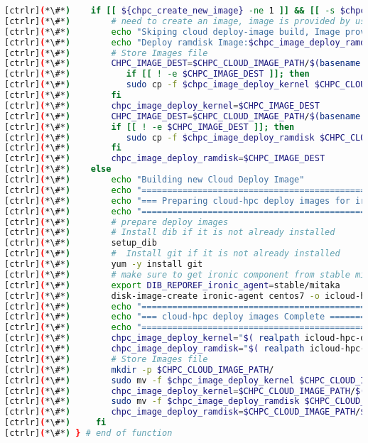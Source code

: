 \begin{lstlisting}[language=bash,keywords={}]
[ctrlr](*\#*)    if [[ ${chpc_create_new_image} -ne 1 ]] && [[ -s $chpc_image_deploy_kernel ]] && [[ -s $chpc_image_deploy_ramdisk ]]; then
[ctrlr](*\#*)        # need to create an image, image is provided by user
[ctrlr](*\#*)        echo "Skiping cloud deploy-image build, Image provided:"
[ctrlr](*\#*)        echo "Deploy ramdisk Image:$chpc_image_deploy_ramdisk"
[ctrlr](*\#*)        # Store Images file
[ctrlr](*\#*)        CHPC_IMAGE_DEST=$CHPC_CLOUD_IMAGE_PATH/$(basename $chpc_image_deploy_kernel)
[ctrlr](*\#*)           if [[ ! -e $CHPC_IMAGE_DEST ]]; then
[ctrlr](*\#*)           sudo cp -f $chpc_image_deploy_kernel $CHPC_CLOUD_IMAGE_PATH/
[ctrlr](*\#*)        fi
[ctrlr](*\#*)        chpc_image_deploy_kernel=$CHPC_IMAGE_DEST
[ctrlr](*\#*)        CHPC_IMAGE_DEST=$CHPC_CLOUD_IMAGE_PATH/$(basename $chpc_image_deploy_ramdisk)
[ctrlr](*\#*)        if [[ ! -e $CHPC_IMAGE_DEST ]]; then
[ctrlr](*\#*)           sudo cp -f $chpc_image_deploy_ramdisk $CHPC_CLOUD_IMAGE_PATH/
[ctrlr](*\#*)        fi
[ctrlr](*\#*)        chpc_image_deploy_ramdisk=$CHPC_IMAGE_DEST
[ctrlr](*\#*)    else
[ctrlr](*\#*)        echo "Building new Cloud Deploy Image"
[ctrlr](*\#*)        echo "====================================================================="
[ctrlr](*\#*)        echo "=== Preparing cloud-hpc deploy images for ironic====================="
[ctrlr](*\#*)        echo "====================================================================="
[ctrlr](*\#*)        # prepare deploy images
[ctrlr](*\#*)        # Install dib if it is not already installed
[ctrlr](*\#*)        setup_dib
[ctrlr](*\#*)        #  Install git if it is not already installed
[ctrlr](*\#*)        yum -y install git
[ctrlr](*\#*)        # make sure to get ironic component from stable mitaka release
[ctrlr](*\#*)        export DIB_REPOREF_ironic_agent=stable/mitaka
[ctrlr](*\#*)        disk-image-create ironic-agent centos7 -o icloud-hpc-deploy-c7
[ctrlr](*\#*)        echo "====================================================================="
[ctrlr](*\#*)        echo "=== cloud-hpc deploy images Complete ================================"
[ctrlr](*\#*)        echo "====================================================================="
[ctrlr](*\#*)        chpc_image_deploy_kernel="$( realpath icloud-hpc-deploy-c7.kernel)"
[ctrlr](*\#*)        chpc_image_deploy_ramdisk="$( realpath icloud-hpc-deploy-c7.initramfs)"
[ctrlr](*\#*)        # Store Images file
[ctrlr](*\#*)        mkdir -p $CHPC_CLOUD_IMAGE_PATH/
[ctrlr](*\#*)        sudo mv -f $chpc_image_deploy_kernel $CHPC_CLOUD_IMAGE_PATH/
[ctrlr](*\#*)        chpc_image_deploy_kernel=$CHPC_CLOUD_IMAGE_PATH/$(basename $chpc_image_deploy_kernel)
[ctrlr](*\#*)        sudo mv -f $chpc_image_deploy_ramdisk $CHPC_CLOUD_IMAGE_PATH/
[ctrlr](*\#*)        chpc_image_deploy_ramdisk=$CHPC_CLOUD_IMAGE_PATH/$(basename $chpc_image_deploy_ramdisk)
[ctrlr](*\#*)     fi
[ctrlr](*\#*) } # end of function
\end{lstlisting}




